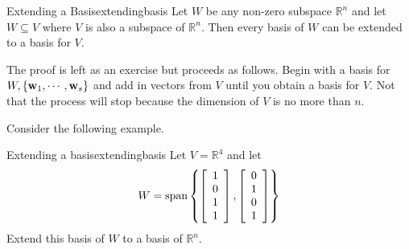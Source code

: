\begin{theorem}{Extending a Basis}{extendingbasis}
Let $W$ be any non-zero subspace $\mathbb{R}^{n}$ and let $W\subseteq V$
where $V$ is also a subspace of $\mathbb{R}^{n}$. Then every basis of $W$
can be extended to a basis for $V$.
\end{theorem}

The proof is left as an exercise but proceeds as follows. Begin with a basis for $W,\left\{ {\bf w}_{1},\cdots ,{\bf w}_{s}\right\} $ and add in vectors from $V$ until you obtain a basis for $V$.
Not that the process will stop because the dimension of $V$ is no more than $n$. 

Consider the following example.

\begin{example}{Extending a basis}{extendingbasis}
Let $V=\mathbb{R}^{4}$ and let 
\begin{equation*}
W=\mbox{span}\left\{ \left[
\begin{array}{c}
1 \\ 
0 \\ 
1 \\ 
1
\end{array}
\right] ,\left[ 
\begin{array}{c}
0 \\ 
1 \\ 
0 \\ 
1
\end{array}
\right] \right\}
\end{equation*}
Extend this basis of $W$ to a basis of $\mathbb{R}^{n}$.
\end{example}

